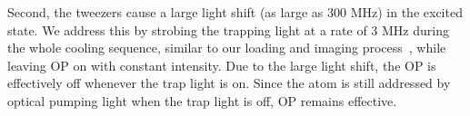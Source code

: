 \documentclass[aps,prl,twocolumn,groupedaddress]{revtex4-1}
\begin{document}
Second, the tweezers cause a large light shift (as large as $300$ MHz)
in the excited state. %
We address this by strobing the trapping light at a rate of 3 MHz during the whole cooling sequence,
similar to our loading and imaging process~\cite{Hutzler2017-LightShifts},
while leaving OP on with constant intensity.
Due to the large light shift, the OP is effectively off whenever the trap light is on.
Since the atom is still addressed by  optical pumping light when the trap light is off, OP remains effective.
\end{document}
